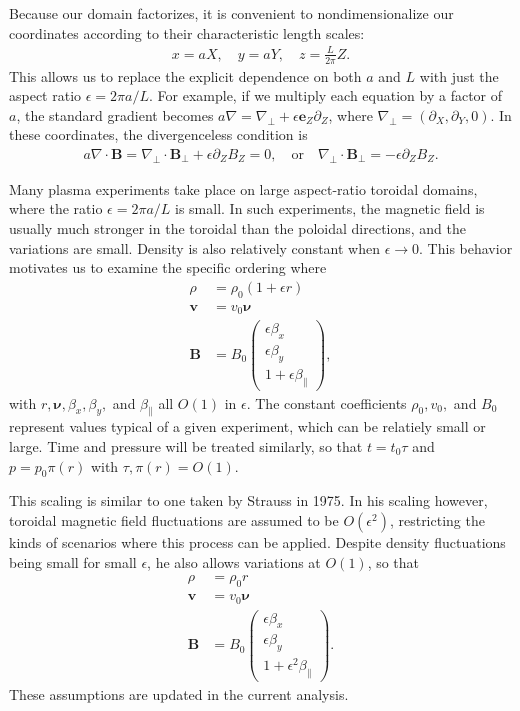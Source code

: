 \documentclass{article}
\newcommand{\para}{\parallel}
\newcommand{\ep}{\epsilon}
\newcommand{\np}{\nabla_\perp}
\newcommand{\p}{\partial}
\newcommand{\pth} [1] {\left( #1 \right) }
\newcommand{\pmat} [1] {\begin{pmatrix} #1 \end{pmatrix}}
\begin{document}
Because our domain factorizes, it is convenient to nondimensionalize our coordinates according to their characteristic length scales: 
\begin{align*}
    x=aX,\quad y=aY,\quad z=\frac{L}{2\pi}Z.
\end{align*}
This allows us to replace the explicit dependence on both $a$ and $L$ with just the aspect ratio $\ep = 2\pi a/L$. For example, if we multiply each equation by a factor of $a$, the standard gradient becomes $a\nabla = \np + \ep\bm{e}_Z\p_Z$, where $\np = \pth{\p_X, \p_Y, 0}$. In these coordinates, the divergenceless condition is    
\begin{align*}
    a\nabla\cdot\bm{B} = \np\cdot\bm{B}_\perp + \ep\p_Z B_Z = 0, \quad\text{or}\quad \np\cdot\bm{B}_\perp = -\ep\p_ZB_Z. 
\end{align*}

Many plasma experiments take place on large aspect-ratio toroidal domains, where the ratio $\ep = 2\pi a/L$ is small. In such experiments, the magnetic field is usually much stronger in the toroidal than the poloidal directions, and the variations are small. Density is also relatively constant when $\ep\to 0$. This behavior motivates us to examine the specific ordering where 
\begin{align*}
    \rho &= \rho_0 \pth{1+\ep r} \\
    \bm{v} &= v_0 \bm{\nu} \\ 
    \bm{B} &= B_0 \pmat{\ep\beta_x \\ \ep\beta_y \\ 1+\ep\beta_\para},
\end{align*}
with $r, \bm{\nu}, \beta_x, \beta_y,$ and $\beta_\para$ all $O\pth{1}$ in $\ep$. The constant coefficients $\rho_0, v_0,$ and $B_0$ represent values typical of a given experiment, which can be relatiely small or large. Time and pressure will be treated similarly, so that $t=t_0\tau$ and $p=p_0\pi(r)$ with $\tau,\pi(r) = O(1)$. 

This scaling is similar to one taken by Strauss in 1975. In his scaling however, toroidal magnetic field fluctuations are assumed to be $O\pth{\ep^2}$, restricting the kinds of scenarios where this process can be applied. Despite density fluctuations being small for small $\ep$, he also allows variations at $O(1)$, so that 
\begin{align*}
    \rho &= \rho_0 r \\
    \bm{v} &= v_0 \bm{\nu} \\ 
    \bm{B} &= B_0 \pmat{\ep\beta_x \\ \ep\beta_y \\ 1+\ep^2\beta_\para}.
\end{align*}
These assumptions are updated in the current analysis. 
\end{document}
